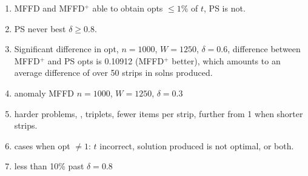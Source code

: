 \documentclass[runningheads]{llncs}
\begin{document}
\begin{enumerate}
	\item MFFD and MFFD$^+$ able to obtain opts $\leq 1\%$ of $t$, PS is not.
	\item PS never best $\delta \geq 0.8$.
	\item Significant difference in opt, $n = 1000$, $W = 1250$, $\delta = 0.6$, difference between MFFD$^+$ and PS opts is 0.10912 (MFFD$^+$ better), which amounts to an average difference of over 50 strips in solns produced.
	\item anomaly MFFD $n = 1000$, $W = 1250$, $\delta = 0.3$
	\item harder problems, \cite{falkenauer1996}, triplets, fewer items per strip, further from 1 when shorter strips.
	\item cases when opt $\neq 1$: $t$ incorrect, solution produced is not optimal, or both.
	\item less than 10\% past $\delta = 0.8$
\end{enumerate}
\end{document}
